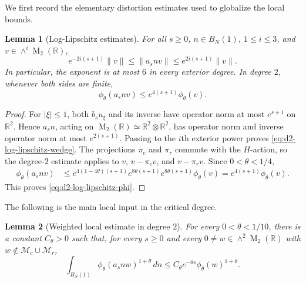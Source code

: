 \documentclass[reqno,11pt]{amsart}
\newtheorem{lem}[lem]{Lemma}
\theoremstyle{definition}
\theoremstyle{remark}
\numberwithin{equation}{section}
\newcommand{\M}{\operatorname{M}}
\begin{document}
We first record the elementary distortion estimates used to globalize the
local bounds.

\begin{lem}[Log-Lipschitz estimates]
\label{lem:d2-log-lipschitz}
For all $s\ge0$, $n\in B_N(1)$, $1\le i\le3$, and
$v\in\wedge^i\M_2(\mathbb R)$,
\begin{equation}\label{eq:d2-log-lipschitz-wedge}
e^{-2i(s+1)}\|v\|
\le
\|a_snv\|
\le
e^{2i(s+1)}\|v\|.
\end{equation}
In particular, the exponent is at most $6$ in every exterior degree. In
degree $2$, whenever both sides are finite,
\begin{equation}\label{eq:d2-log-lipschitz-phi}
\phi_\theta(a_snv)
\le
e^{4(s+1)}\phi_\theta(v).
\end{equation}
\end{lem}

\begin{proof}
For $|\xi|\le1$, both $b_su_\xi$ and its inverse have operator norm at
most $e^{s+1}$ on $\mathbb R^2$. Hence $a_sn$, acting on
$\M_2(\mathbb R)\simeq\mathbb R^2\otimes\mathbb R^2$, has operator norm
and inverse operator norm at most $e^{2(s+1)}$. Passing to the $i$th exterior
power proves \eqref{eq:d2-log-lipschitz-wedge}. The projections $\pi_c$ and $\pi_r$ commute with the $H$-action, so the
degree-$2$ estimate applies to $v$, $v-\pi_cv$, and $v-\pi_rv$. Since
$0<\theta<1/4$,
$$
\begin{aligned}
\phi_\theta(a_snv)
&\le
e^{4(1-4\theta)(s+1)}
e^{8\theta(s+1)}
e^{8\theta(s+1)}
\phi_\theta(v)=
e^{4(s+1)}\phi_\theta(v).
\end{aligned}
$$
This proves \eqref{eq:d2-log-lipschitz-phi}.
\end{proof}

The following is the main local input in the critical
degree.

\begin{lem}[Weighted local estimate in degree $2$]
\label{lem:weighted-local-d2}
For every $0<\theta<1/10$, there is a constant $C_\theta>0$ such that,
for every $s\ge0$ and every
$0\ne w\in\wedge^2\M_2(\mathbb R)$ with
$w\notin\mathcal M_c\cup\mathcal M_r$,
$$
\int_{B_N(1)}
\phi_\theta(a_snw)^{1+\theta}\,dn
\le
C_\theta e^{-\theta s}\phi_\theta(w)^{1+\theta}.
$$
\end{lem}
\end{document}
